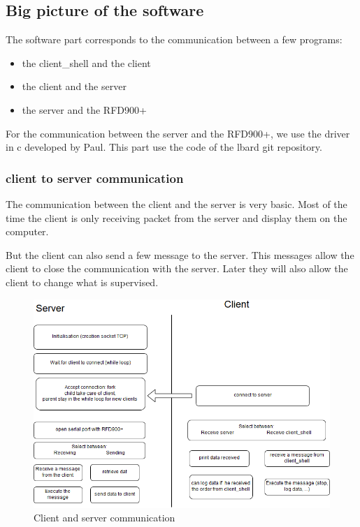 \subsection{Big picture of the software}



The software part corresponds to the communication between a few programs:
\begin{itemize}
	\item the client\_shell and the client
	\item the client and the server
	\item the server and the RFD900+
\end{itemize}

For the communication between the server and the RFD900+, we use the driver in c developed by Paul. This part use the code of the lbard git repository.


\subsubsection{client to server communication}

The communication between the client and the server is very basic. Most of the time the client is only receiving packet from the server and display them on the computer.

But the client can also send a few message to the server. This messages allow the client to close the communication with the server. Later they will also allow the client to change what is supervised.

\begin{figure}[H]
\begin{center}
\includegraphics[width=\textwidth]{image/clientServer.png}%
\caption{Client and server communication}%
\label{figure:CS}%
\end{center}
\end{figure}





